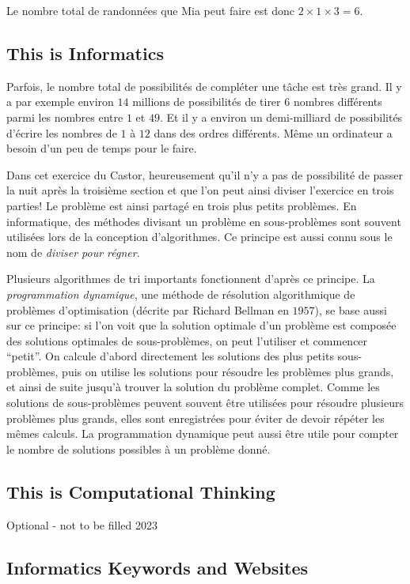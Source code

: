 \documentclass[a4paper,11pt]{report}
\begin{document}
Le nombre total de randonnées que Mia peut faire est donc ${2 \times 1 \times 3 = 6}$.


\subsection*{This is Informatics}

Parfois, le nombre total de possibilités de compléter une tâche est très grand. Il y a par exemple environ $14$ millions de possibilités de tirer $6$ nombres différents parmi les nombres entre $1$ et $49$. Et il y a environ un demi-milliard de possibilités d’écrire les nombres de $1$ à $12$ dans des ordres différents. Même un ordinateur a besoin d’un peu de temps pour le faire.

Dans cet exercice du Castor, heureusement qu’il n’y a pas de possibilité de passer la nuit après la troisième section et que l’on peut ainsi diviser l’exercice en trois parties! Le problème est ainsi partagé en trois plus petits problèmes. En informatique, des méthodes divisant un problème en sous-problèmes sont souvent utilisées lors de la conception d’algorithmes. Ce principe est aussi connu sous le nom de \emph{diviser pour régner}.

Plusieurs algorithmes de tri importants fonctionnent d’après ce principe. La \emph{programmation dynamique}, une méthode de résolution algorithmique de problèmes d’optimisation (décrite par Richard Bellman en $1957$), se base aussi sur ce principe: si l’on voit que la solution optimale d’un problème est composée des solutions optimales de sous-problèmes, on peut l’utiliser et commencer “petit”. On calcule d’abord directement les solutions des plus petits sous-problèmes, puis on utilise les solutions pour résoudre les problèmes plus grands, et ainsi de suite jusqu’à trouver la solution du problème complet. Comme les solutions de sous-problèmes peuvent souvent être utilisées pour résoudre plusieurs problèmes plus grands, elles sont enregistrées pour éviter de devoir répéter les mêmes calculs. La programmation dynamique peut aussi être utile pour compter le nombre de solutions possibles à un problème donné.


\subsection*{This is Computational Thinking}

Optional - not to be filled 2023


\subsection*{Informatics Keywords and Websites}
\end{document}
